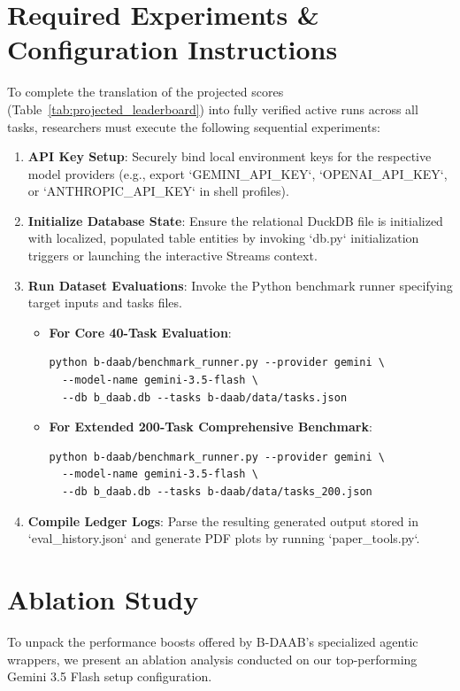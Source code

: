\documentclass[11pt,a4paper]{article}
\begin{document}
\section{Required Experiments & Configuration Instructions}
To complete the translation of the projected scores (Table~\ref{tab:projected_leaderboard}) into fully verified active runs across all tasks, researchers must execute the following sequential experiments:

\begin{enumerate}
    \item \textbf{API Key Setup}: Securely bind local environment keys for the respective model providers (e.g., export `GEMINI_API_KEY`, `OPENAI_API_KEY`, or `ANTHROPIC_API_KEY` in shell profiles).
    \item \textbf{Initialize Database State}: Ensure the relational DuckDB file is initialized with localized, populated table entities by invoking `db.py` initialization triggers or launching the interactive Streams context.
    \item \textbf{Run Dataset Evaluations}:
    Invoke the Python benchmark runner specifying target inputs and tasks files.
    \begin{itemize}
        \item \textbf{For Core 40-Task Evaluation}:
        \begin{verbatim}
python b-daab/benchmark_runner.py --provider gemini \
  --model-name gemini-3.5-flash \
  --db b_daab.db --tasks b-daab/data/tasks.json
        \end{verbatim}
        \item \textbf{For Extended 200-Task Comprehensive Benchmark}:
        \begin{verbatim}
python b-daab/benchmark_runner.py --provider gemini \
  --model-name gemini-3.5-flash \
  --db b_daab.db --tasks b-daab/data/tasks_200.json
        \end{verbatim}
    \end{itemize}
    \item \textbf{Compile Ledger Logs}: Parse the resulting generated output stored in `eval_history.json` and generate PDF plots by running `paper_tools.py`.
\end{enumerate}

\section{Ablation Study}
To unpack the performance boosts offered by B-DAAB's specialized agentic wrappers, we present an ablation analysis conducted on our top-performing Gemini 3.5 Flash setup configuration.
\end{document}
